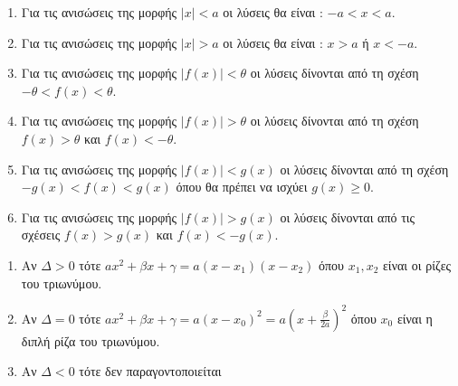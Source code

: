 \documentclass[twoside,nofonts,internet,shmeiwseis]{thewria}
\begin{document}
\begin{enumerate}
\item Για τις ανισώσεις της μορφής $ |x|<a $ οι λύσεις θα είναι : $ -a<x<a $.
\item Για τις ανισώσεις της μορφής $ |x|>a $ οι λύσεις θα είναι : $ x>a $ ή $ x<-a $.
\item Για τις ανισώσεις της μορφής $ |f(x)|<\theta $ οι λύσεις δίνονται από τη σχέση $ -\theta<f(x)<\theta $.
\item Για τις ανισώσεις της μορφής $ |f(x)|>\theta $ οι λύσεις δίνονται από τη σχέση $ f(x)>\theta $ και $ f(x)<-\theta $.
\item Για τις ανισώσεις της μορφής $ |f(x)|<g(x) $ οι λύσεις δίνονται από τη σχέση $ -g(x)<f(x)<g(x) $ όπου θα πρέπει να ισχύει $ g(x)\geq0 $.
\item Για τις ανισώσεις της μορφής $ |f(x)|>g(x) $ οι λύσεις δίνονται από τις σχέσεις $ f(x)>g(x) $ και $ f(x)<-g(x) $.
\end{enumerate}
\begin{enumerate}[itemsep=0mm]
\item Αν $ \varDelta>0 $ τότε $ ax^2+\beta x+\gamma=a(x-x_1)(x-x_2) $ όπου $ x_1,x_2 $ είναι οι ρίζες του τριωνύμου.
\item Αν $ \varDelta=0  $ τότε $ ax^2+\beta x+\gamma=a\left(x-x_0\right)^2=a\left(x+\frac{\beta}{2a}\right)^2 $ όπου $ x_0 $ είναι η διπλή ρίζα του τριωνύμου.
\item Αν $ \varDelta<0 $ τότε δεν παραγοντοποιείται
\end{enumerate}
\end{document}
